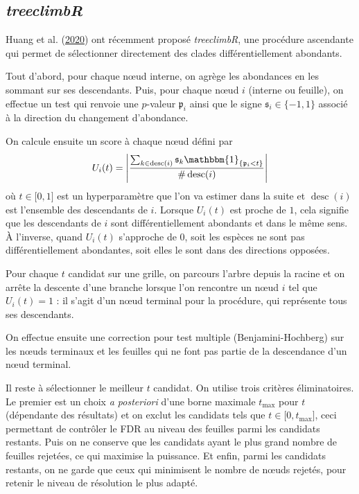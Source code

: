 \documentclass[12pt,a4paper]{reedthesis}
\newcommand \indic {\mathbbm{1}}
\newcommand \pv {\mathfrak{p}}
\newcommand \sign {\mathfrak{s}}
\DeclareMathOperator*{\desc}{desc}
\theoremstyle{definition}
\theoremstyle{definition}
\theoremstyle{definition}
\theoremstyle{remark}
\begin{document}
\hypertarget{treeclimbr}{%
\subsection{\texorpdfstring{\emph{treeclimbR}}{treeclimbR}}\label{treeclimbr}}

Huang et al. (\protect\hyperlink{ref-huang2020treeclimbr}{2020}) ont récemment proposé \emph{treeclimbR}, une procédure ascendante qui permet de sélectionner directement des clades différentiellement abondants.

Tout d'abord, pour chaque nœud interne, on agrège les abondances en les sommant sur ses descendants. Puis, pour chaque nœud \(i\) (interne ou feuille), on effectue un test qui renvoie une \(p\)-valeur \(\pv_i\) ainsi que le signe \(\sign_i\in \{-1,1\}\) associé à la direction du changement d'abondance.

On calcule ensuite un score à chaque nœud défini par
\begin{equation*}
U_i(t) = \left|\frac{\sum_{k \in \desc(i)} \sign_k \indic_{\{\pv_i < t\}}}{\#\desc(i)}\right|
\end{equation*}
où \(t \in \mathopen[0,1\mathclose]\) est un hyperparamètre que l'on va estimer dans la suite et \(\desc(i)\) est l'ensemble des descendants de \(i\). Lorsque \(U_i(t)\) est proche de \(1\), cela signifie que les descendants de \(i\) sont différentiellement abondants et dans le même sens. À l'inverse, quand \(U_i(t)\) s'approche de \(0\), soit les espèces ne sont pas différentiellement abondantes, soit elles le sont dans des directions opposées.

Pour chaque \(t\) candidat sur une grille, on parcours l'arbre depuis la racine et on arrête la descente d'une branche lorsque l'on rencontre un nœud \(i\) tel que \(U_i(t) = 1\) : il s'agit d'un nœud terminal pour la procédure, qui représente tous ses descendants.

On effectue ensuite une correction pour test multiple (Benjamini-Hochberg) sur les nœuds terminaux et les feuilles qui ne font pas partie de la descendance d'un nœud terminal.

Il reste à sélectionner le meilleur \(t\) candidat. On utilise trois critères éliminatoires. Le premier est un choix \emph{a posteriori} d'une borne maximale \(t_{\max}\) pour \(t\) (dépendante des résultats) et on exclut les candidats tels que \(t\in\mathopen[0, t_{\max}\mathclose]\), ceci permettant de contrôler le FDR au niveau des feuilles parmi les candidats restants. Puis on ne conserve que les candidats ayant le plus grand nombre de feuilles rejetées, ce qui maximise la puissance. Et enfin, parmi les candidats restants, on ne garde que ceux qui minimisent le nombre de nœuds rejetés, pour retenir le niveau de résolution le plus adapté.
\end{document}
